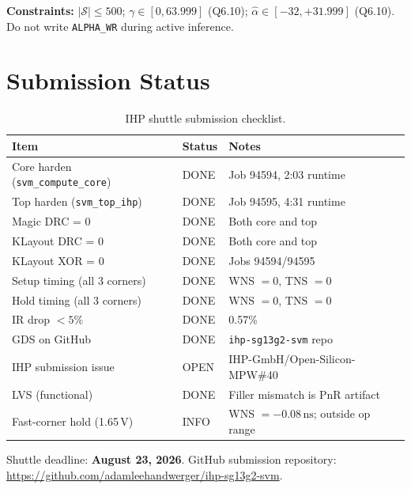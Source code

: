 \documentclass[11pt]{article}
\begin{document}
\noindent\textbf{Constraints:}
$|\mathcal{S}| \le 500$;
$\gamma \in [0, 63.999]$ (Q6.10);
$\hat\alpha \in [-32, +31.999]$ (Q6.10).
Do not write \texttt{ALPHA\_WR} during active inference.

\section{Submission Status}

\begin{table}[H]
  \centering
  \caption{IHP shuttle submission checklist.}
  \label{tab:checklist}
  \small
  \begin{tabular}{lll}
    \toprule
    Item & Status & Notes \\
    \midrule
    Core harden (\texttt{svm\_compute\_core}) & DONE & Job 94594, 2:03 runtime \\
    Top harden (\texttt{svm\_top\_ihp})       & DONE & Job 94595, 4:31 runtime \\
    Magic DRC = 0                              & DONE & Both core and top \\
    KLayout DRC = 0                            & DONE & Both core and top \\
    KLayout XOR = 0                            & DONE & Jobs 94594/94595 \\
    Setup timing (all 3 corners)               & DONE & WNS $= 0$, TNS $= 0$ \\
    Hold timing (all 3 corners)                & DONE & WNS $= 0$, TNS $= 0$ \\
    IR drop $< 5\%$                            & DONE & 0.57\% \\
    GDS on GitHub                              & DONE & \texttt{ihp-sg13g2-svm} repo \\
    IHP submission issue                       & OPEN & IHP-GmbH/Open-Silicon-MPW\#40 \\
    LVS (functional)                           & DONE & Filler mismatch is PnR artifact \\
    Fast-corner hold (1.65\,V)                 & INFO & WNS $= -0.08\,\mathrm{ns}$; outside op range \\
    \bottomrule
  \end{tabular}
\end{table}

\noindent Shuttle deadline: \textbf{August 23, 2026}.
GitHub submission repository:
\url{https://github.com/adamleehandwerger/ihp-sg13g2-svm}.
\end{document}
